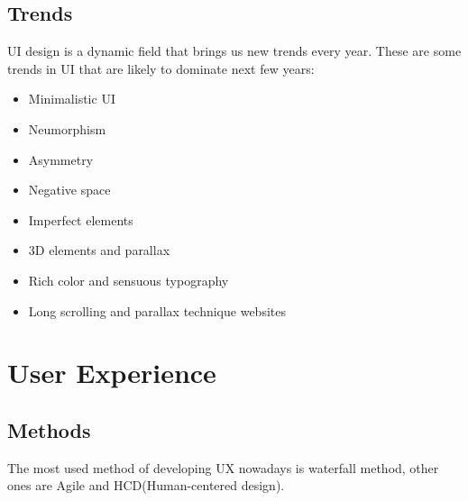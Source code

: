 \documentclass[10pt,twoside,english,a4paper]{article}
\begin{document}
\subsection{Trends}
UI design is a dynamic field that brings us new trends every year. These are some trends in UI that are likely to dominate next few years:
\begin{itemize}
\item Minimalistic UI
\item Neumorphism
\item Asymmetry
\item Negative space
\item Imperfect elements
\item 3D elements and parallax
\item Rich color and sensuous typography
\item Long scrolling and parallax technique websites 
\cite{UItrends}
\cite{UnderstandingUI}
\end{itemize}

\section{User Experience} \label{UX}
\subsection{Methods}
The most used method of developing UX nowadays is waterfall method, other ones are Agile and HCD(Human-centered design).

\cite{WaterfallUX}
\end{document}
